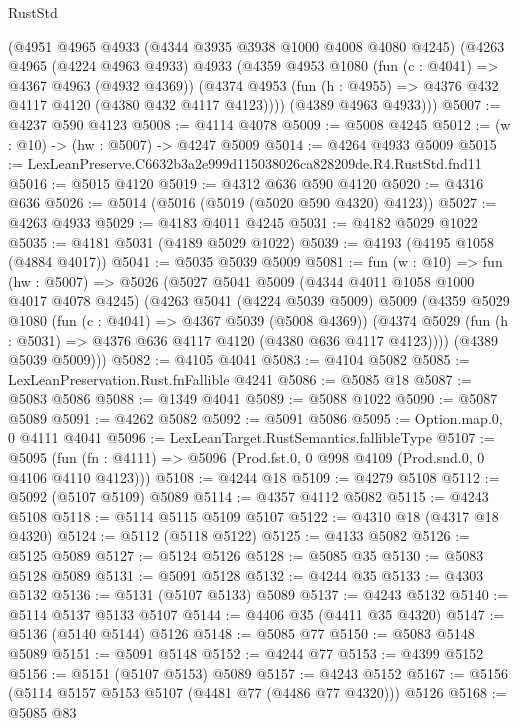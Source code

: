 \begin{lexlean}{RustStd}
\begin{coremodule}
    (@4951
      @4965
      @4933
      (@4344 @3935 @3938 @1000 @4008 @4080 @4245)
      (@4263
        @4965
        (@4224 @4963 @4933)
        @4933
        (@4359
          @4953
          @1080
          (fun (c : @4041) => @4367 @4963 (@4932 @4369))
          (@4374 @4953 (fun (h : @4955) => @4376 @432 @4117 @4120 (@4380 @432 @4117 @4123))))
        (@4389 @4963 @4933)))
@5007 := @4237 @590 @4123
@5008 := @4114 @4078
@5009 := @5008 @4245
@5012 := (w : @10) -> (hw : @5007) -> @4247 @5009
@5014 := @4264 @4933 @5009
@5015 := LexLeanPreserve.C6632b3a2e999d115038026ca828209de.R4.RustStd.fnd11
@5016 := @5015 @4120
@5019 := @4312 @636 @590 @4120
@5020 := @4316 @636
@5026 := @5014 (@5016 (@5019 (@5020 @590 @4320) @4123))
@5027 := @4263 @4933
@5029 := @4183 @4011 @4245
@5031 := @4182 @5029 @1022
@5035 := @4181 @5031 (@4189 @5029 @1022)
@5039 := @4193 (@4195 @1058 (@4884 @4017))
@5041 := @5035 @5039 @5009
@5081 := fun (w : @10) =>
  fun (hw : @5007) =>
  @5026
    (@5027
      @5041
      @5009
      (@4344 @4011 @1058 @1000 @4017 @4078 @4245)
      (@4263
        @5041
        (@4224 @5039 @5009)
        @5009
        (@4359
          @5029
          @1080
          (fun (c : @4041) => @4367 @5039 (@5008 @4369))
          (@4374 @5029 (fun (h : @5031) => @4376 @636 @4117 @4120 (@4380 @636 @4117 @4123))))
        (@4389 @5039 @5009)))
@5082 := @4105 @4041
@5083 := @4104 @5082
@5085 := LexLeanPreservation.Rust.fnFallible @4241
@5086 := @5085 @18
@5087 := @5083 @5086
@5088 := @1349 @4041
@5089 := @5088 @1022
@5090 := @5087 @5089
@5091 := @4262 @5082
@5092 := @5091 @5086
@5095 := Option.map.{0, 0} @4111 @4041
@5096 := LexLeanTarget.RustSemantics.fallibleType
@5107 := @5095
    (fun (fn : @4111) => @5096 (Prod.fst.{0, 0} @998 @4109 (Prod.snd.{0, 0} @4106 @4110 @4123)))
@5108 := @4244 @18
@5109 := @4279 @5108
@5112 := @5092 (@5107 @5109) @5089
@5114 := @4357 @4112 @5082
@5115 := @4243 @5108
@5118 := @5114 @5115 @5109 @5107
@5122 := @4310 @18 (@4317 @18 @4320)
@5124 := @5112 (@5118 @5122)
@5125 := @4133 @5082
@5126 := @5125 @5089
@5127 := @5124 @5126
@5128 := @5085 @35
@5130 := @5083 @5128 @5089
@5131 := @5091 @5128
@5132 := @4244 @35
@5133 := @4303 @5132
@5136 := @5131 (@5107 @5133) @5089
@5137 := @4243 @5132
@5140 := @5114 @5137 @5133 @5107
@5144 := @4406 @35 (@4411 @35 @4320)
@5147 := @5136 (@5140 @5144) @5126
@5148 := @5085 @77
@5150 := @5083 @5148 @5089
@5151 := @5091 @5148
@5152 := @4244 @77
@5153 := @4399 @5152
@5156 := @5151 (@5107 @5153) @5089
@5157 := @4243 @5152
@5167 := @5156 (@5114 @5157 @5153 @5107 (@4481 @77 (@4486 @77 @4320))) @5126
@5168 := @5085 @83

\end{coremodule}
\end{lexlean}
